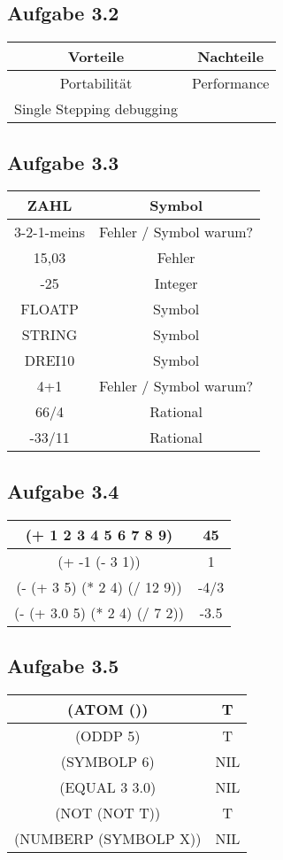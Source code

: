 \documentclass[a4paper, 12pt]{article}
\begin{document}
\subsection*{Aufgabe 3.2}
\begin{tabular}{|c|c|}\hline
  \textbf{Vorteile}         &\textbf{Nachteile} \\\hline
  Portabilität              & Performance       \\\hline
  Single Stepping debugging &                   \\\hline

  

\end{tabular}

\subsection*{Aufgabe 3.3}
\begin{tabular}{|c|c|}
  \hline
  ZAHL        & Symbol \\ \hline
  3-2-1-meins & Fehler / Symbol warum? \\ \hline
  15,03       & Fehler \\ \hline
  -25         & Integer \\ \hline
  FLOATP      & Symbol \\ \hline
  STRING      & Symbol \\ \hline
  DREI10      & Symbol \\ \hline
  4+1         & Fehler / Symbol warum? \\ \hline
  66/4        & Rational \\ \hline
  -33/11      & Rational \\ \hline
\end{tabular}

\subsection*{Aufgabe 3.4}
\begin{tabular}{|c|c|}
  \hline
  (+ 1 2 3 4 5 6 7 8 9)         & 45 \\ \hline
  (+ -1 (- 3 1))                & 1 \\ \hline
  (- (+ 3 5) (* 2 4) (/ 12 9))  & -4/3 \\ \hline
  (- (+ 3.0 5) (* 2 4) (/ 7 2)) & -3.5 \\ \hline
\end{tabular}

\subsection*{Aufgabe 3.5}
\begin{tabular}{|c|c|}
  \hline
  (ATOM ()) & T \\ \hline
  (ODDP 5) & T \\ \hline
  (SYMBOLP 6) & NIL \\ \hline
  (EQUAL 3 3.0) & NIL \\ \hline
  (NOT (NOT T)) & T \\ \hline
  (NUMBERP (SYMBOLP X)) & NIL \\ \hline
\end{tabular}
\end{document}
